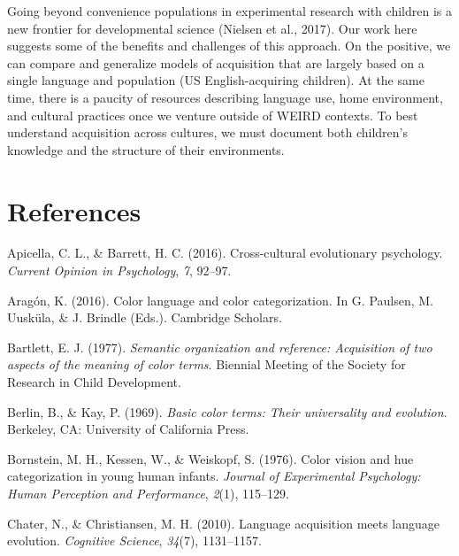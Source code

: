\documentclass[
  english,
  ,man,floatsintext]{apa6}
\begin{document}
Going beyond convenience populations in experimental research with children is a new frontier for developmental science (Nielsen et al., 2017). Our work here suggests some of the benefits and challenges of this approach. On the positive, we can compare and generalize models of acquisition that are largely based on a single language and population (US English-acquiring children). At the same time, there is a paucity of resources describing language use, home environment, and cultural practices once we venture outside of WEIRD contexts. To best understand acquisition across cultures, we must document both children's knowledge and the structure of their environments.

\newpage

\hypertarget{references}{%
\section{References}\label{references}}

\begingroup
\setlength{\parindent}{-0.5in}
\setlength{\leftskip}{0.5in}

\hypertarget{refs}{}
\leavevmode\hypertarget{ref-apicella2016}{}%
Apicella, C. L., \& Barrett, H. C. (2016). Cross-cultural evolutionary psychology. \emph{Current Opinion in Psychology}, \emph{7}, 92--97.

\leavevmode\hypertarget{ref-aragon2016}{}%
Aragón, K. (2016). Color language and color categorization. In G. Paulsen, M. Uusküla, \& J. Brindle (Eds.). Cambridge Scholars.

\leavevmode\hypertarget{ref-bartlett1977}{}%
Bartlett, E. J. (1977). \emph{Semantic organization and reference: Acquisition of two aspects of the meaning of color terms}. Biennial Meeting of the Society for Research in Child Development.

\leavevmode\hypertarget{ref-berlin1969}{}%
Berlin, B., \& Kay, P. (1969). \emph{Basic color terms: Their universality and evolution}. Berkeley, CA: University of California Press.

\leavevmode\hypertarget{ref-bornstein1976}{}%
Bornstein, M. H., Kessen, W., \& Weiskopf, S. (1976). Color vision and hue categorization in young human infants. \emph{Journal of Experimental Psychology: Human Perception and Performance}, \emph{2}(1), 115--129.

\leavevmode\hypertarget{ref-chater2010}{}%
Chater, N., \& Christiansen, M. H. (2010). Language acquisition meets language evolution. \emph{Cognitive Science}, \emph{34}(7), 1131--1157.
\end{document}
